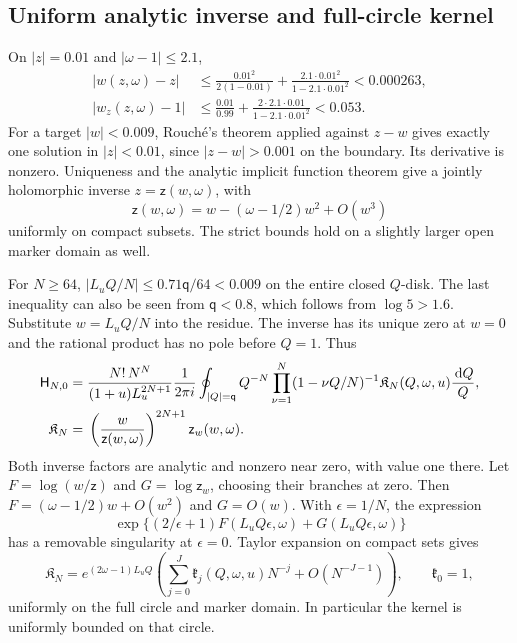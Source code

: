 \documentclass[11pt]{article}
\numberwithin{equation}{section}
\theoremstyle{definition}
\theoremstyle{remark}
\newcommand{\dd}{\,\mathrm d}
\begin{document}
\subsection{Uniform analytic inverse and full-circle kernel}
On $|z|=0.01$ and $|\omega-1|\le2.1$,
\begin{align*}
 |w(z,\omega)-z|&\le\frac{0.01^2}{2(1-0.01)}
       +\frac{2.1\cdot0.01^2}{1-2.1\cdot0.01^2}<0.000263,\\
 |w_z(z,\omega)-1|&\le\frac{0.01}{0.99}
       +\frac{2\cdot2.1\cdot0.01}{1-2.1\cdot0.01^2}<0.053.
\end{align*}
For a target $|w|<0.009$, Rouch\'e's theorem applied against $z-w$ gives
exactly one solution in $|z|<0.01$, since $|z-w|>0.001$ on the boundary. Its
derivative is nonzero. Uniqueness and the analytic implicit function theorem
give a jointly holomorphic inverse $z=\mathsf z(w,\omega)$, with
\begin{equation}\label{mxc:pm:eq:psi}
 \mathsf z(w,\omega)=w-(\omega-1/2)w^2+O(w^3)
\end{equation}
uniformly on compact subsets. The strict bounds hold on a slightly larger
open marker domain as well.

For $N\ge64$, $|L_uQ/N|\le0.71\mathsf q/64<0.009$ on the entire closed $Q$-disk.
The last inequality can also be seen from $\mathsf q<0.8$, which follows from
$\log5>1.6$. Substitute $w=L_uQ/N$ into the residue. The inverse has its
unique zero at $w=0$ and the rational product has no pole before $Q=1$. Thus
\begin{align}\label{mxc:pm:eq:markedintegral}
 \mathsf H_{N,0}={}&\frac{N!\,N^N}{(1+u)L_u^{2N+1}}\frac1{2\pi i}
 \oint_{|Q|=\mathsf q}Q^{-N}\prod_{\nu=1}^N(1-\nu Q/N)^{-1}
                    \mathfrak K_N(Q,\omega,u)\frac{\dd Q}{Q},\notag\\
 \mathfrak K_N={}&\left(\frac{w}{\mathsf z(w,\omega)}\right)^{2N+1}\mathsf z_w(w,\omega).
\end{align}
Both inverse factors are analytic and nonzero near zero, with value one there.
Let $F=\log(w/\mathsf z)$ and $G=\log\mathsf z_w$, choosing their branches at
zero. Then $F=(\omega-1/2)w+O(w^2)$ and $G=O(w)$. With $\epsilon=1/N$, the
expression
\[
 \exp\{(2/\epsilon+1)F(L_uQ\epsilon,\omega)+G(L_uQ\epsilon,\omega)\}
\]
has a removable singularity at $\epsilon=0$. Taylor expansion on compact sets
gives
\begin{equation}\label{mxc:pm:eq:markedkernel}
 \mathfrak K_N=e^{(2\omega-1)L_uQ}
       \left(\sum_{j=0}^J\mathfrak k_j(Q,\omega,u)N^{-j}+O(N^{-J-1})\right),
 \qquad \mathfrak k_0=1,
\end{equation}
uniformly on the full circle and marker domain. In particular the kernel is
uniformly bounded on that circle.
\end{document}
